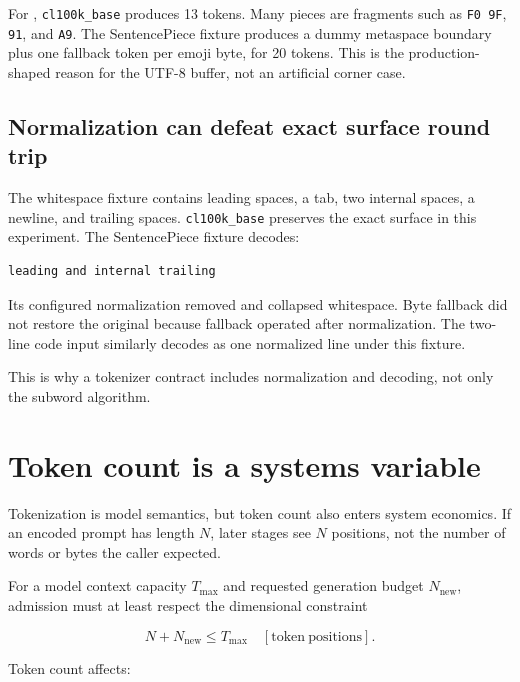 For ,
\texttt{cl100k\_base} produces 13 tokens. Many pieces are fragments such
as \texttt{F0\ 9F}, \texttt{91}, and \texttt{A9}. The SentencePiece
fixture produces a dummy metaspace boundary plus one fallback token per
emoji byte, for 20 tokens. This is the production-shaped reason for the
UTF-8 buffer, not an artificial corner case.

\subsection{Normalization can defeat exact surface round
trip}\label{normalization-can-defeat-exact-surface-round-trip}

The whitespace fixture contains leading spaces, a tab, two internal
spaces, a newline, and trailing spaces. \texttt{cl100k\_base} preserves
the exact surface in this experiment. The SentencePiece fixture decodes:

\begin{verbatim}
leading and internal trailing
\end{verbatim}

Its configured normalization removed and collapsed whitespace. Byte
fallback did not restore the original because fallback operated after
normalization. The two-line code input similarly decodes as one
normalized line under this fixture.

This is why a tokenizer contract includes normalization and decoding,
not only the subword algorithm.

\section{Token count is a systems
variable}\label{token-count-is-a-systems-variable}

Tokenization is model semantics, but token count also enters system
economics. If an encoded prompt has length \(N\), later stages see \(N\)
positions, not the number of words or bytes the caller expected.

For a model context capacity \(T_{\max}\) and requested generation
budget \(N_{\mathrm{new}}\), admission must at least respect the
dimensional constraint

\begin{equation}
N+N_{\mathrm{new}}\le T_{\max}\quad[\mathrm{token\ positions}].
\end{equation}

Token count affects:

